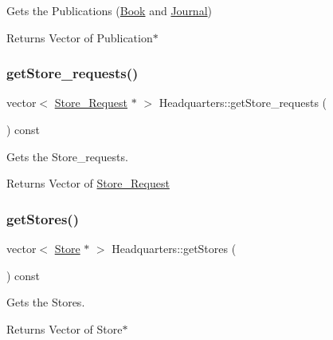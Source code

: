 Gets the Publications (\hyperlink{class_book}{Book} and \hyperlink{class_journal}{Journal}) 

\begin{DoxyReturn}{Returns}
Vector of Publication$\ast$ 
\end{DoxyReturn}
\mbox{\label{class_headquarters_a68177abe09961053fe98aa3bcdfb6fdd}} 
\subsubsection{\texorpdfstring{get\+Store\+\_\+requests()}{getStore\_requests()}}
{\footnotesize\ttfamily vector$<$ \hyperlink{class_store___request}{Store\+\_\+\+Request} $\ast$ $>$ Headquarters\+::get\+Store\+\_\+requests (\begin{DoxyParamCaption}{ }\end{DoxyParamCaption}) const}



Gets the Store\+\_\+requests. 

\begin{DoxyReturn}{Returns}
Vector of \hyperlink{class_store___request}{Store\+\_\+\+Request} 
\end{DoxyReturn}
\mbox{\label{class_headquarters_a37aa3d25dcd693e6537a0bdd361942d8}} 
\subsubsection{\texorpdfstring{get\+Stores()}{getStores()}}
{\footnotesize\ttfamily vector$<$ \hyperlink{class_store}{Store} $\ast$ $>$ Headquarters\+::get\+Stores (\begin{DoxyParamCaption}{ }\end{DoxyParamCaption}) const}



Gets the Stores. 

\begin{DoxyReturn}{Returns}
Vector of Store$\ast$ 
\end{DoxyReturn}
\mbox{\label{class_headquarters_a92e2ecf8f496e2681a71a13b91d0da7d}} 
